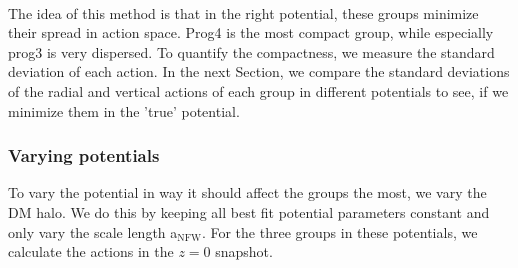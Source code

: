 \\The idea of this method is that in the right potential, these groups minimize their spread in action space. Prog4 is the most compact group, while especially prog3 is very dispersed. To quantify the compactness, we measure the standard deviation of each action. In the next Section, we compare the standard deviations of the radial and vertical actions of each group in different potentials to see, if we minimize them in the 'true' potential.

\subsubsection{Varying potentials}\label{subsubsec:GCs_actions_varying_pot}
To vary the potential in way it should affect the groups the most, we vary the \ac{DM} halo. We do this by keeping all best fit potential parameters constant and only vary the scale length a$_\mathrm{NFW}$. For the three groups in these potentials, we calculate the actions in the $z=0$ snapshot.
